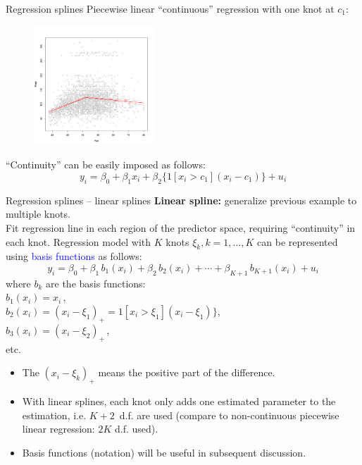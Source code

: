 \documentclass{beamer}
\begin{document}
\begin{frame}{Regression splines}
\centering
Piecewise linear ``continuous'' regression with one knot at $c_1$:\\
\vspace{-0.2cm}
\begin{figure}
  \centering
  \includegraphics[trim=0cm 0cm 0cm 0cm, clip=true, width=0.4\textwidth]{IMG/ISLR73b.pdf}
\end{figure}
\vspace{-0.5cm}
``Continuity'' can be easily imposed as follows:
$$ y_i = \beta_0 + \beta_1x_i + \beta_2\{1[x_i > c_1](x_i-c_1)\} + u_i$$
\end{frame}
\begin{frame}{Regression splines -- linear splines}
\textbf{Linear spline:} generalize previous example to multiple knots.\\ Fit regression line in each region of the predictor space, requiring ``continuity'' in each knot. Regression model with $K$ knots $\xi_k, k=1,\dots, K$ can be represented using \textcolor{blue}{basis functions} as follows:
$$y_i = \beta_0 + \beta_1 \, b_1 (x_i) + \beta_2 \, b_2 (x_i) + \cdots  + \beta_{K+1} \, b_{K+1} (x_i) + u_i  $$
where $b_k$ are the basis functions:\\
\smallskip
\qquad $b_1 (x_i) = x_i$\,,\\
\qquad $b_2 (x_i) = (x_i-\xi_1)_{+} = 1[x_i > \xi_1](x_i-\xi_1)\}$,\\
\qquad $b_3 (x_i) = (x_i-\xi_2)_{+}$\,, \\ \qquad etc.\\
\medskip
\begin{itemize}
    \item The $(x_i-\xi_k)_{+}$ means the positive part of the difference.
    \smallskip
    \item With linear splines, each knot only adds one estimated parameter to the estimation, i.e. $K\!+\!2\,$ d.f. are used (compare to non-continuous piecewise linear regression: $2K$ d.f. used).
    \smallskip
    \item Basis functions (notation) will be useful in subsequent discussion.
\end{itemize}
\end{frame}
\end{document}
